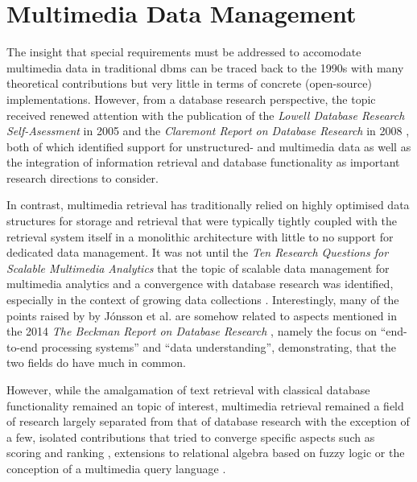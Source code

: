 \chapter{Multimedia Data Management}
\label{chapter:theory_multimedia_database}

The insight that special requirements must be addressed to accomodate multimedia data in traditional \acrshort{dbms} can be traced back to the 1990s \cite{Marcus:1996Foundations,Adjeroh:1997Multimedia} with many theoretical contributions but very little in terms of concrete (open-source) implementations. However, from a database research perspective, the topic received renewed attention with the publication of the \emph{Lowell Database Research Self-Asessment} in 2005 \cite{Abiteboul:2005Lowell} and the \emph{Claremont Report on Database Research} in 2008 \cite{Agrawal:2008Claremont}, both of which identified support for unstructured- and multimedia data as well as the integration of information retrieval and database functionality as important research directions to consider.

In contrast, multimedia retrieval has traditionally relied on highly optimised data structures for storage and retrieval that were typically tightly coupled with the retrieval system itself in a monolithic architecture with little to no support for dedicated data management. It was not until the \emph{Ten Research Questions for Scalable Multimedia Analytics} \cite{Jonson:2016Ten} that the topic of scalable data management for multimedia analytics and a convergence with database research was identified, especially in the context of growing data collections \cite{Berns:2019V3C1,Rossetto:2021Insights}. Interestingly, many of the points raised by by Jónsson et al. are somehow related to aspects mentioned in the 2014 \emph{The Beckman Report on Database Research} \cite{Abadi:2014Beckman}, namely the focus on ``end-to-end processing systems'' and ``data understanding'', demonstrating, that the two fields do have much in common.

However, while the amalgamation of text retrieval with classical database functionality remained an topic of interest, multimedia retrieval remained a field of research largely separated from that of database research with the exception of a few, isolated contributions that tried to converge specific aspects such as scoring and ranking \cite{Chengkai:2005RankSQL,Zhang:2006Boolean}, extensions to relational algebra based on fuzzy logic \cite{Montesi:1999Similarity} or the conception of a multimedia query language \cite{Budikova:2012Query}.

